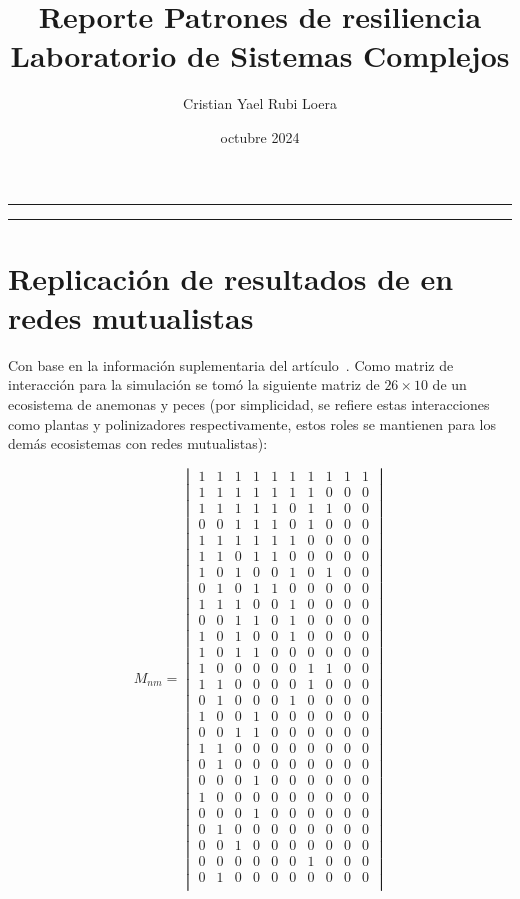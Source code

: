 \documentclass[11pt]{article}
\title{\textsf{
    Reporte Patrones de resiliencia\\
Laboratorio de Sistemas Complejos}}
\author{Cristian Yael Rubi Loera}
\date{octubre 2024}
\begin{document}
 \begin{minipage}[t]{\textwidth}
   \centering
   \raisebox{-\baselineskip}{\rule{\textwidth}{1px}}
   \rule{\textwidth}{1px}
   \vspace{0.2cm}
   \maketitle
   \rule{\textwidth}{2px}
 \end{minipage}
 
\newpage

\setcounter{page}{2}

\section{Replicación de resultados de en redes mutualistas}


Con base en la información suplementaria del artículo~\cite{gao2016universal}.
Como matriz de interacción para la simulación se tomó la siguiente matriz de $26 \times 10$ de un ecosistema de anemonas y peces (por simplicidad, se refiere estas interacciones como plantas y polinizadores respectivamente, estos roles se mantienen para los demás ecosistemas con redes mutualistas):

\begin{equation*}
M_{nm}=\begin{vmatrix}
1&1&1&1&1&1&1&1&1&1\\
1&1&1&1&1&1&1&0&0&0\\
1&1&1&1&1&0&1&1&0&0\\
0&0&1&1&1&0&1&0&0&0\\
1&1&1&1&1&1&0&0&0&0\\
1&1&0&1&1&0&0&0&0&0\\
1&0&1&0&0&1&0&1&0&0\\
0&1&0&1&1&0&0&0&0&0\\
1&1&1&0&0&1&0&0&0&0\\
0&0&1&1&0&1&0&0&0&0\\
1&0&1&0&0&1&0&0&0&0\\
1&0&1&1&0&0&0&0&0&0\\
1&0&0&0&0&0&1&1&0&0\\
1&1&0&0&0&0&1&0&0&0\\
0&1&0&0&0&1&0&0&0&0\\
1&0&0&1&0&0&0&0&0&0\\
0&0&1&1&0&0&0&0&0&0\\
1&1&0&0&0&0&0&0&0&0\\
0&1&0&0&0&0&0&0&0&0\\
0&0&0&1&0&0&0&0&0&0\\
1&0&0&0&0&0&0&0&0&0\\
0&0&0&1&0&0&0&0&0&0\\
0&1&0&0&0&0&0&0&0&0\\
0&0&1&0&0&0&0&0&0&0\\
0&0&0&0&0&0&1&0&0&0\\
0&1&0&0&0&0&0&0&0&0\\
\end{vmatrix}
\end{equation*}
\end{document}
